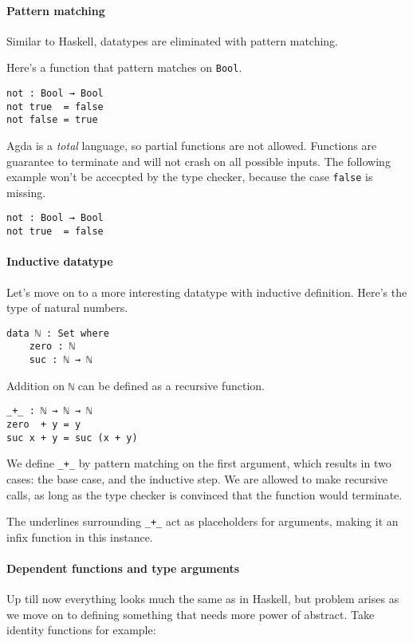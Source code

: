 \documentclass[12pt, a4paper]{article}
\begin{document}
\paragraph{Pattern matching}
Similar to Haskell, datatypes are eliminated with pattern matching.

Here's a function that pattern matches on {\lstinline|Bool|}.

\begin{lstlisting}
not : Bool → Bool
not true  = false
not false = true
\end{lstlisting}

Agda is a \textit{total} language, so partial functions are not allowed. Functions
are guarantee to terminate and will not crash on all possible inputs. The following
example won't be accecpted by the type checker, because the case {\lstinline|false|} is missing.

\begin{lstlisting}
not : Bool → Bool
not true  = false
\end{lstlisting}

\paragraph{Inductive datatype} Let's move on to a more interesting datatype with inductive definition. Here's the type of natural numbers.
\begin{lstlisting}
data ℕ : Set where
    zero : ℕ
    suc : ℕ → ℕ
\end{lstlisting}

Addition on {\lstinline|ℕ|} can be defined as a recursive function.

\begin{lstlisting}
_+_ : ℕ → ℕ → ℕ
zero  + y = y
suc x + y = suc (x + y)
\end{lstlisting}

We define {\lstinline|_+_|} by pattern matching on the first argument, which results
in two cases: the base case, and the inductive step. We are allowed to make
recursive calls, as long as the type checker is convinced that the function
would terminate.

The underlines surrounding {\lstinline|_+_|} act as placeholders for arguments, making
it an infix function in this instance.

\paragraph{Dependent functions and type arguments}
Up till now everything looks much the same as in Haskell, but problem arises as
we move on to defining something that needs more power of abstract. Take identity
functions for example:
\end{document}
